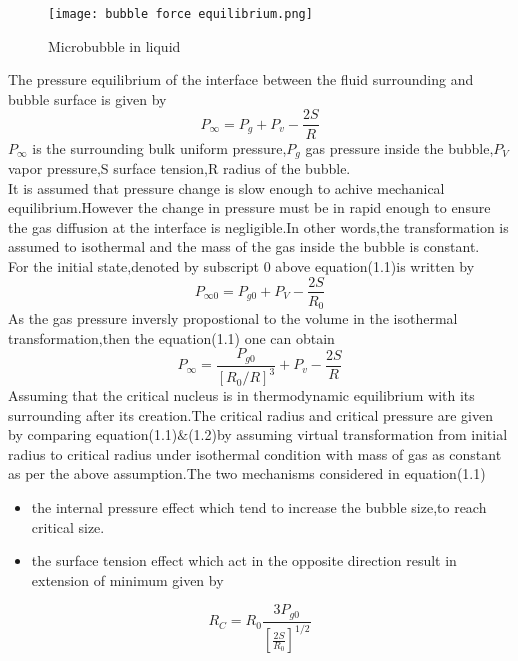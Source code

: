  \begin{figure}[H]
    \centering
    \texttt{[image: bubble force equilibrium.png]}
    \caption{Microbubble in liquid}
    \label{fig:fig3}
\end{figure}
The pressure equilibrium of the interface between the fluid surrounding and bubble surface is given by\\
   \begin{equation}
      P_{\infty} =P_g + P_v -\frac{2S}{R}
      \end{equation}
      ${P_\infty}$ is the surrounding bulk uniform pressure,$P_g$ gas pressure inside the bubble,$P_V$vapor pressure,S surface tension,R radius of the bubble.\\
  It is assumed that pressure change is slow enough to achive mechanical equilibrium.However the change in pressure must be in rapid enough to ensure the gas diffusion at the interface is negligible.In
  other words,the transformation is assumed to isothermal and the mass of the gas inside the bubble is constant.\\
  For the initial state,denoted by subscript 0 above equation(1.1)is written by
 \begin{equation}
 P_{{\infty}{0}} =P_{g0}+P_V-\frac{2S}{R_0}
 \end{equation}
 As the gas pressure inversly propostional to the volume in the isothermal transformation,then the equation(1.1) one can obtain
 \begin{equation}
      P_{\infty} =\frac{P_{g0}}{{[{R_0}/{R}]}^{3}} +P_v -\frac{2S}{R}
      \end{equation}
  Assuming that the critical nucleus is in thermodynamic equilibrium with its surrounding after its creation.The critical radius and critical pressure are given by comparing equation(1.1)$\&$(1.2)by assuming
  virtual transformation from initial radius to critical radius under isothermal condition with mass of gas as constant as per the above assumption.The two mechanisms considered in equation(1.1)
  \begin{itemize}
  \item the internal pressure effect which tend to increase the bubble size,to reach critical size.
  \item the surface tension effect which act in the opposite direction result in extension of minimum given by
  \end{itemize}
  \begin{equation}
  R_C = R_0 \frac {3P_{g0}}{[{\frac{2S}{R_0}}]^{1/2}}
  \end{equation}
  
